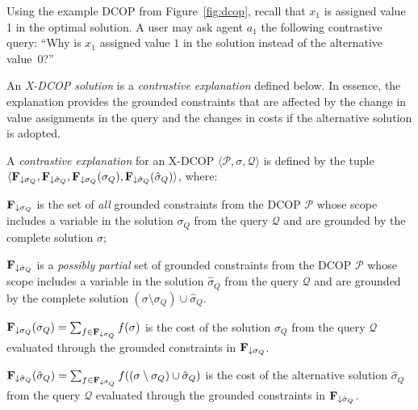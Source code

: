 \documentclass[twoside,11pt]{article}
\begin{document}
\begin{example}[X-DCOP]
\label{example1}
Using the example DCOP from Figure~\ref{fig:dcop}, recall that $x_1$ is assigned value 1 in the optimal solution. A user may ask agent $a_1$ the following contrastive query: ``Why is $x_1$ assigned value $1$ in the solution instead of the alternative value~$0$?'' 
\end{example}

An \emph{X-DCOP solution} is a \emph{contrastive explanation} defined below. In essence, the explanation provides the grounded constraints that are affected by the change in value assignments in the query and the changes in costs if the alternative solution is adopted.

\begin{definition}
\label{def:solution}
A \emph{contrastive explanation} for an X-DCOP $\langle \mathcal{P}, \sigma, \mathcal{Q} \rangle$ is defined by the tuple $\langle {\bf{F}}_{\downarrow \sigma_Q}, {\bf{F}}_{\downarrow \hat{\sigma}_Q}, {\bf{F}}_{\downarrow \sigma_Q}(\sigma_Q), {\bf{F}}_{\downarrow \hat{\sigma}_Q}(\hat{\sigma}_Q) \rangle$, where:
\squishlist
\item ${\bf{F}}_{\downarrow \sigma_Q}$ %
is the set of \emph{all} grounded constraints from the DCOP $\mathcal{P}$ whose scope includes a variable in the solution $\sigma_Q$ from the query $\mathcal{Q}$ and are grounded by the complete solution $\sigma$;
\item ${\bf{F}}_{\downarrow \hat{\sigma}_Q}$ 
is a \emph{possibly partial} set of grounded constraints from the DCOP $\mathcal{P}$ whose scope includes a variable in the solution $\hat{\sigma}_Q$ from the query $\mathcal{Q}$ and are grounded by the complete solution $(\sigma \setminus \sigma_Q) \cup \hat{\sigma}_Q$.
\item ${\bf{F}}_{\downarrow \sigma_Q}(\sigma_Q) = \sum_{f \in {\bf{F}}_{\downarrow \sigma_Q}} f(\sigma)$ is the cost of the solution $\sigma_Q$ from the query $\mathcal{Q}$ evaluated through the grounded constraints in ${\bf{F}}_{\downarrow \sigma_Q}$.
\item ${\bf{F}}_{\downarrow \hat{\sigma}_Q}(\hat{\sigma}_Q) = \sum_{f \in {\bf{F}}_{\downarrow \hat{\sigma}_Q}} f((\sigma \setminus \sigma_Q) \cup \hat{\sigma}_Q)$ is the cost of the alternative solution $\hat{\sigma}_Q$ from the query $\mathcal{Q}$ evaluated through the grounded constraints in ${\bf{F}}_{\downarrow \hat{\sigma}_Q}$.
\squishend
\end{definition}
\end{document}
